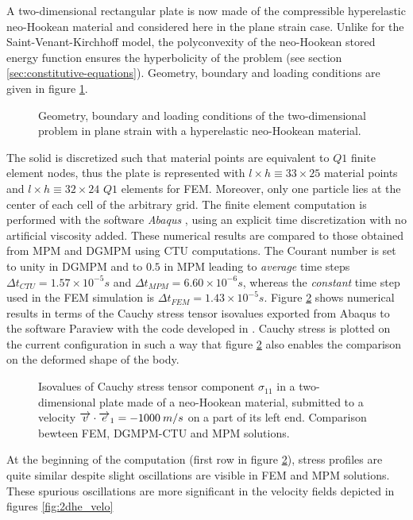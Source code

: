 
A two-dimensional rectangular plate is now made of the compressible hyperelastic neo-Hookean material and considered here in the plane strain case. Unlike for the Saint-Venant-Kirchhoff model, the polyconvexity of the neo-Hookean stored energy function ensures the hyperbolicity of the problem (see section \ref{sec:constitutive-equations}).
Geometry, boundary and loading conditions are given in figure \ref{fig:2d_heDomain}.
\begin{figure}[h!]
  \centering
  
  \caption{Geometry, boundary and loading conditions of the two-dimensional problem in plane strain with a hyperelastic neo-Hookean material.}
  \label{fig:2d_heDomain}
\end{figure}

The solid is discretized such that material points are equivalent to $Q1$ finite element nodes, thus the plate is represented with $l \times h \equiv 33 \times 25$ material points and $l \times h \equiv 32 \times 24$ $Q1$ elements for FEM. Moreover, only one particle lies at the center of each cell of the arbitrary grid. The finite element computation is performed with the software \textit{Abaqus} \cite{Abaqus}, using an explicit time discretization with no artificial viscosity added. These numerical results are compared to those obtained from MPM and DGMPM using CTU computations. The Courant number is set to unity in DGMPM and to $0.5$ in MPM leading to \textit{average} time steps $\Delta t_{CTU}=1.57 \times 10^{-5}s$ and $\Delta t_{MPM}=6.60 \times 10^{-6}s$, whereas the \textit{constant} time step used in the FEM simulation is $\Delta t_ {FEM}=1.43 \times 10^{-5} s$. Figure \ref{fig:2dhe_stress} shows numerical results in terms of the Cauchy stress tensor isovalues exported from Abaqus to the software Paraview \cite{Paraview} with the code developed in \cite{Export_Abaqus}. Cauchy stress is plotted on the current configuration in such a way that figure \ref{fig:2dhe_stress} also enables the comparison on the deformed shape of the body.
\begin{figure}[h!]
  \centering
  
  \caption{Isovalues of Cauchy stress tensor component $\sigma_{11}$ in a two-dimensional plate made of a neo-Hookean material, submitted to a velocity ${\overrightarrow{v}}\cdot{\overrightarrow{e}}_1=-1000 \: m/s$ on a part of its left end. Comparison bewteen FEM, DGMPM-CTU and MPM solutions.}
  \label{fig:2dhe_stress}
\end{figure}
At the beginning of the computation (first row in figure \ref{fig:2dhe_stress}), stress profiles are quite similar despite slight oscillations are visible in FEM and MPM solutions. These spurious oscillations are more significant in the velocity fields depicted in figures \ref{fig:2dhe_velo}
